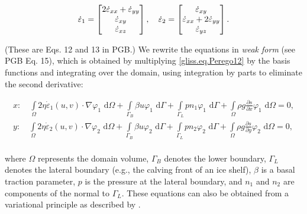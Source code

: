 \begin{equation}
  \label{gliss.eq.Perego13}
  {{{\dot{\varepsilon }}}_{1}}=\left[ \begin{matrix}
      2{{{\dot{\varepsilon }}}_{xx}}+{{{\dot{\varepsilon }}}_{yy}} \\ 
      {{{\dot{\varepsilon }}}_{xy}} \\ 
      {{{\dot{\varepsilon }}}_{xz}} \\ 
    \end{matrix} \right], \quad
  {{{\dot{\varepsilon }}}_{2}}=\left[ \begin{matrix}
      {{{\dot{\varepsilon }}}_{xy}} \\ 
      {{{\dot{\varepsilon }}}_{xx}}+2{{{\dot{\varepsilon }}}_{yy}} \\ 
      {{{\dot{\varepsilon }}}_{yz}} \\ 
    \end{matrix} \right].  \\
\end{equation}

\noindent
(These are Eqs. 12 and 13 in PGB.)  We rewrite the equations in \textit{weak form} (see PGB Eq. 15), which
is obtained by multiplying \eqref{gliss.eq.Perego12} by the basis functions and integrating over the domain, using 
integration by parts to eliminate the second derivative:

\begin{equation}
  \label{gliss.eq.weak_form}
  \begin{split}
    x: \quad \int\limits_{\Omega } {2\eta {{{\dot{\varepsilon }}}_{1}}(u,v)\cdot \nabla {{\varphi }_{1}} \text{ d}\Omega }
      + \int\limits_{{\Gamma }_{B}} {\beta u{{\varphi }_{1}} \text{ d}\Gamma} 
      + \int\limits_{{\Gamma }_{L}} {p n_1 {{\varphi }_{1}} \text{ d}\Gamma}
      + \int\limits_{\Omega } {\rho g\frac{\partial s}{\partial x}{{\varphi }_{1}} \text{ d}\Omega}
      = \text{0},  \\
    y: \quad \int\limits_{\Omega } {2\eta {{{\dot{\varepsilon }}}_{2}}(u,v)\cdot \nabla {{\varphi }_{2}} \text{ d}\Omega }
      + \int\limits_{{\Gamma }_{B}} {\beta u{{\varphi }_{2}} \text{ d}\Gamma} 
      + \int\limits_{{\Gamma }_{L}} {p n_2 {{\varphi }_{2}} \text{ d}\Gamma}
      + \int\limits_{\Omega } {\rho g\frac{\partial s}{\partial y}{{\varphi }_{2}} \text{ d}\Omega}
      = \text{0},  \\
  \end{split}
\end{equation}

\noindent
where $\Omega$ represents the domain volume, $\Gamma_{B}$ denotes the lower boundary, $\Gamma_{L}$ denotes the lateral
boundary (e.g., the calving front of an ice shelf), $\beta$ is a basal traction parameter, $p$ is the pressure at the 
lateral boundary, and $n_1$ and $n_2$ are components of the normal to $\Gamma_L$.
These equations can also be obtained from a variational principle as described by \citet{DUKOWICZ:2010wb}.

